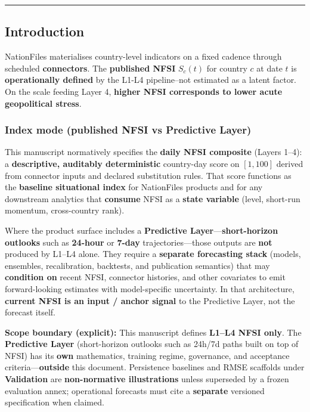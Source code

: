 \documentclass[
  11pt,
  peerreview,journal,onecolumn]{IEEEtran}
\begin{document}
\begin{center}\rule{0.5\linewidth}{0.5pt}\end{center}

\hypertarget{introduction}{%
\subsection{Introduction}\label{introduction}}

NationFiles materialises country-level indicators on a fixed cadence
through scheduled \textbf{connectors}. The \textbf{published NFSI}
\(S_c(t)\) for country \(c\) at date \(t\) is \textbf{operationally
defined} by the L1-L4 pipeline--not estimated as a latent factor. On the
scale feeding Layer 4, \textbf{higher NFSI corresponds to lower acute
geopolitical stress}.

\hypertarget{index-mode-published-nfsi-vs-predictive-layer}{%
\subsubsection{Index mode (published NFSI vs Predictive
Layer)}\label{index-mode-published-nfsi-vs-predictive-layer}}

This manuscript normatively specifies the \textbf{daily NFSI composite}
(Layers 1--4): a \textbf{descriptive, auditably deterministic}
country-day score on \([1,100]\) derived from connector inputs and
declared substitution rules. That score functions as the
\textbf{baseline situational index} for NationFiles products and for any
downstream analytics that \textbf{consume} NFSI as a \textbf{state
variable} (level, short-run momentum, cross-country rank).

Where the product surface includes a \textbf{Predictive
Layer}---\textbf{short-horizon outlooks} such as \textbf{24-hour} or
\textbf{7-day} trajectories---those outputs are \textbf{not} produced by
L1--L4 alone. They require a \textbf{separate forecasting stack}
(models, ensembles, recalibration, backtests, and publication semantics)
that may \textbf{condition on} recent NFSI, connector histories, and
other covariates to emit forward-looking estimates with model-specific
uncertainty. In that architecture, \textbf{current NFSI is an input /
anchor signal} to the Predictive Layer, not the forecast itself.

\textbf{Scope boundary (explicit):} This manuscript defines
\textbf{L1--L4 NFSI only}. The \textbf{Predictive Layer} (short-horizon
outlooks such as 24h/7d paths built on top of NFSI) has its \textbf{own}
mathematics, training regime, governance, and acceptance
criteria---\textbf{outside} this document. Persistence baselines and
RMSE scaffolds under \textbf{Validation} are \textbf{non-normative
illustrations} unless superseded by a frozen evaluation annex;
operational forecasts must cite a \textbf{separate} versioned
specification when claimed.
\end{document}
